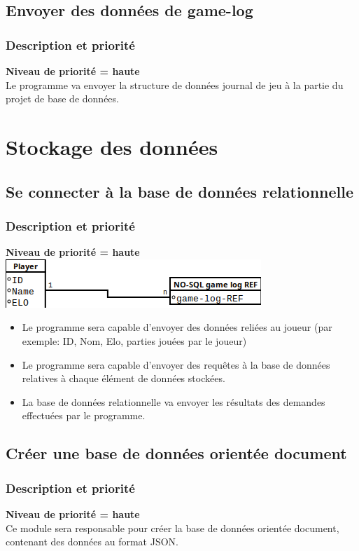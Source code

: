 \documentclass{scrreprt}
\begin{document}
\subsection{Envoyer des données de game-log}
\subsubsection{Description et priorité}
\textbf{Niveau de priorité = haute}\\
Le programme va envoyer la structure de données journal de jeu à la partie du projet de base de données.
\section{Stockage des données}

\subsection{Se connecter à la base de données relationnelle}
\subsubsection{Description et priorité}
\textbf{Niveau de priorité = haute}\\
\includegraphics[keepaspectratio]{SQL}
\begin{itemize}
\item Le programme sera capable d'envoyer des données reliées au joueur (par exemple: ID, Nom, Elo,  parties jouées par le joueur)
\item Le programme sera capable d'envoyer des requêtes à la base de données relatives à chaque élément de données stockées.
\item La base de données relationnelle va envoyer les résultats des demandes effectuées  par le programme.
\end{itemize}


\subsection{Créer une base de données orientée document }

\subsubsection{Description et priorité}
\textbf{Niveau de priorité = haute}\\
Ce module sera responsable pour créer la base de données orientée document, contenant des données au format JSON.
\end{document}
